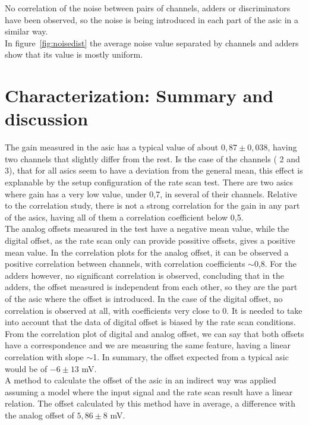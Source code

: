 \documentclass[main.tex]{subfiles}
\begin{document}
No correlation of the noise between pairs of channels, adders or discriminators have been observed, so the noise is being introduced in each part of the \gls{asic} in a similar way.\\
In figure~\ref{fig:noisedist} the average noise value separated by channels and adders show that its value is mostly uniform.

\section{Characterization: Summary and discussion}


The gain measured in the \gls{asic} has a typical value of about $0,87\pm0,038$, having two channels that slightly differ from the rest. Is the case of the channels ( 2 and 3), that for all \glspl{asic} seem to have a deviation from the general mean, this effect is explanable by the setup configuration of the rate scan test. There are two \glspl{asic} where gain has a very low value, under 0,7, in several of their channels. Relative to the correlation study, there is not a strong correlation for the gain in any part of the \glspl{asic}, having all of them a correlation coefficient below 0,5.\\
The analog offsets measured in the test have a negative mean value, while the digital offset, as the rate scan only can provide possitive offsets, gives a positive mean value. In the correlation plots for the analog offset, it can be observed a positive correlation between channels, with correlation coefficients $\sim$0,8. For the adders however, no significant correlation is observed, concluding that in the adders, the offset measured is independent from each other, so they are the part of the \gls{asic} where the offset is introduced.
In the case of the digital offset, no correlation is observed at all, with coefficients very close to 0. It is needed to take into account that the data of digital offset is biased by the rate scan conditions.
From the correlation plot of digital and analog offset, we can say that both offsets have a correspondence and we are measuring the same feature, having a linear correlation with slope $\sim$1.
In summary, the offset expected from a typical \gls{asic} would be of $-6 \pm 13$ mV.\\
A method to calculate the offset of the \gls{asic} in an indirect way was applied assuming a model where the input signal and the rate scan result have a linear relation. The offset calculated by this method have in average, a difference with the analog offset of $5,86 \pm 8$ mV.
\end{document}
